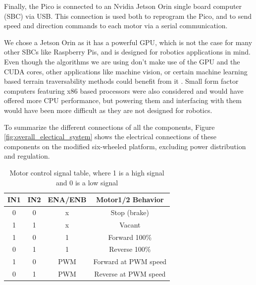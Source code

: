 \documentclass[12pt]{article}
\begin{document}
            Finally, the Pico is connected to an Nvidia Jetson Orin single board computer (SBC) via USB. This connection is used both to reprogram the Pico, and to send speed and direction commands to each motor via a serial communication. 

            We chose a Jetson Orin as it has a powerful GPU, which is not the case for many other SBCs like Raspberry Pis, and is designed for robotics applications in mind. Even though the algorithms we are using don't make use of the GPU and the CUDA cores, other applications like machine vision, or certain machine learning based terrain traversability methods could benefit from it \cite{beycimen2023comprehensive}. Small form factor computers featuring x86 based processors were also considered and would have offered more CPU performance, but powering them and interfacing with them would have been more difficult as they are not designed for robotics.
            
            To summarize the different connections of all the components, Figure \ref{fig:overall_electical_system} shows the electrical connections of these components on the modified six-wheeled platform, excluding power distribution and regulation.


            \begin{table}[h!]
                \centering
                \begin{tabular}{|c|c|c|c|}
                \hline
                IN1 & IN2 & ENA/ENB & Motor1/2 Behavior \\ \hline
                0   & 0   & x       & Stop (brake)      \\ \hline
                1   & 1   & x       & Vacant            \\ \hline
                1   & 0   & 1       & Forward 100\%     \\ \hline
                0   & 1   & 1       & Reverse 100\%     \\ \hline
                1   & 0   & PWM     & Forward at PWM speed \\ \hline
                0   & 1   & PWM     & Reverse at PWM speed \\ \hline
                \end{tabular}
                \caption{Motor control signal table, where 1 is a high signal and 0 is a low signal}
                \label{tab:motor_control}
            \end{table}
\end{document}

